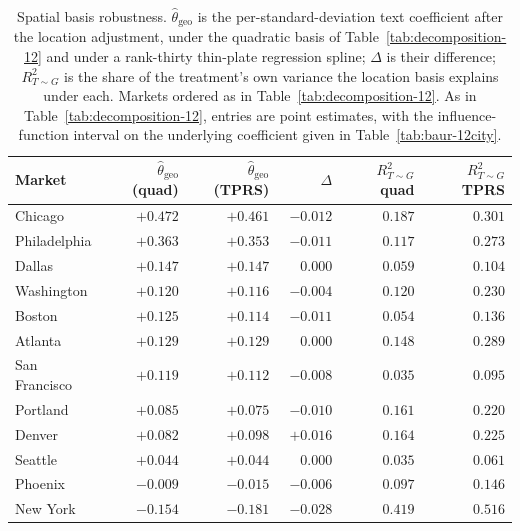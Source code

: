 \begin{table}[H]
\centering
\caption{Spatial basis robustness. $\hat\theta_{\text{geo}}$ is the per-standard-deviation text coefficient after the location adjustment, under the quadratic basis of Table~\ref{tab:decomposition-12} and under a rank-thirty thin-plate regression spline; $\Delta$ is their difference; $R^2_{T\sim G}$ is the share of the treatment's own variance the location basis explains under each. Markets ordered as in Table~\ref{tab:decomposition-12}. As in Table~\ref{tab:decomposition-12}, entries are point estimates, with the influence-function interval on the underlying coefficient given in Table~\ref{tab:baur-12city}.}
\label{tab:decomposition-tprs}
\small
\begin{tabular}{lrrrrr}
\toprule
Market & $\hat\theta_{\text{geo}}$ (quad) & $\hat\theta_{\text{geo}}$ (TPRS) & $\Delta$ & $R^2_{T\sim G}$ quad & $R^2_{T\sim G}$ TPRS \\
\midrule
Chicago       & $+0.472$ & $+0.461$ & $-0.012$ & $0.187$ & $0.301$ \\
Philadelphia  & $+0.363$ & $+0.353$ & $-0.011$ & $0.117$ & $0.273$ \\
Dallas        & $+0.147$ & $+0.147$ & $\phantom{+}0.000$ & $0.059$ & $0.104$ \\
Washington    & $+0.120$ & $+0.116$ & $-0.004$ & $0.120$ & $0.230$ \\
Boston        & $+0.125$ & $+0.114$ & $-0.011$ & $0.054$ & $0.136$ \\
Atlanta       & $+0.129$ & $+0.129$ & $\phantom{+}0.000$ & $0.148$ & $0.289$ \\
San Francisco & $+0.119$ & $+0.112$ & $-0.008$ & $0.035$ & $0.095$ \\
Portland      & $+0.085$ & $+0.075$ & $-0.010$ & $0.161$ & $0.220$ \\
Denver        & $+0.082$ & $+0.098$ & $+0.016$ & $0.164$ & $0.225$ \\
Seattle       & $+0.044$ & $+0.044$ & $\phantom{+}0.000$ & $0.035$ & $0.061$ \\
Phoenix       & $-0.009$ & $-0.015$ & $-0.006$ & $0.097$ & $0.146$ \\
New York      & $-0.154$ & $-0.181$ & $-0.028$ & $0.419$ & $0.516$ \\
\bottomrule
\end{tabular}
\end{table}

